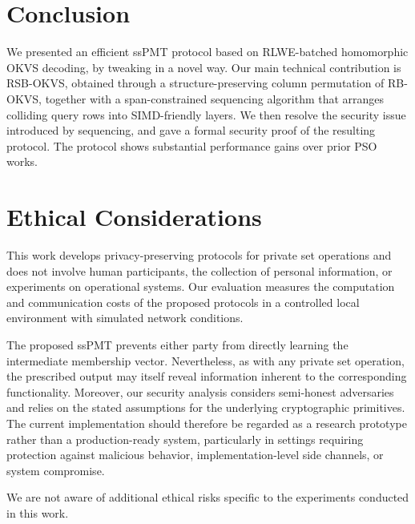 \section{Conclusion}
We presented an efficient ssPMT protocol based on RLWE-batched homomorphic OKVS decoding, by tweaking \cite{ZCL+23} in a novel way. Our main technical contribution is RSB-OKVS, obtained through a structure-preserving column permutation of RB-OKVS\cite{BPSY23}, together with a span-constrained sequencing algorithm that arranges colliding query rows into SIMD-friendly layers. We then resolve the security issue introduced by sequencing, and gave a formal security proof of the resulting protocol.
The protocol shows substantial performance gains over prior PSO works.

\newpage




\appendix

\section*{Ethical Considerations}
This work develops privacy-preserving protocols for private set operations and does not involve human participants, the collection of personal information, or experiments on operational systems. Our evaluation measures the computation and communication costs of the proposed protocols in a controlled local environment with simulated network conditions.

The proposed ssPMT prevents either party from directly learning the intermediate membership vector. Nevertheless, as with any private set operation, the prescribed output may itself reveal information inherent to the corresponding functionality. Moreover, our security analysis considers semi-honest adversaries and relies on the stated assumptions for the underlying cryptographic primitives. The current implementation should therefore be regarded as a research prototype rather than a production-ready system, particularly in settings requiring protection against malicious behavior, implementation-level side channels, or system compromise.

We are not aware of additional ethical risks specific to the experiments conducted in this work.


